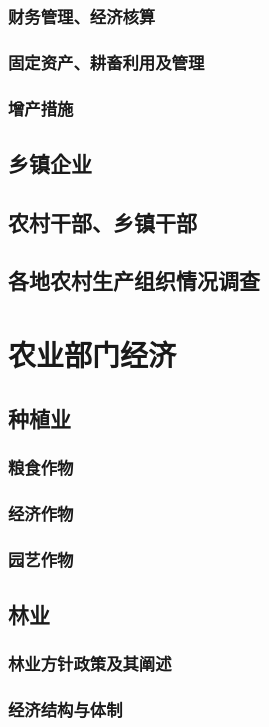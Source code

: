 \documentclass[UTF8]{../../RepresentationUniverse}
\begin{document}
        \subsubsection{财务管理、经济核算}
        \subsubsection{固定资产、耕畜利用及管理}
        \subsubsection{增产措施}
    \subsection{乡镇企业}
    \subsection{农村干部、乡镇干部}
    \subsection{各地农村生产组织情况调查}

\section{农业部门经济}
    \subsection{种植业}
        \subsubsection{粮食作物}
        \subsubsection{经济作物}
        \subsubsection{园艺作物}
    \subsection{林业}
        \subsubsection{林业方针政策及其阐述}
        \subsubsection{经济结构与体制}
\end{document}

